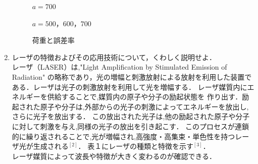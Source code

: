 \documentclass[a4paper,11pt]{jsarticle}
\begin{document}
\begin{enumerate}
\begin{figure}[h]
  \caption{$a = 700$}
\end{figure}
\clearpage
\begin{figure}[h]
  \centering
  \caption{$a = 500，600，700$}
\end{figure}
\clearpage
\begin{figure}[h]
  \centering
  \caption{荷重と誤差率}
\end{figure}
\clearpage
\item レーザの特徴およびその応用技術について，くわしく説明せよ．\\
\quad レーザ（LASER）は,"Light Amplification by Stimulated Emission of Radiation" 
の略称であり，光の増幅と刺激放射による放射を利用した装置である．レーザは光子の刺激放射を利用して光を増幅する．
レーザ媒質内にエネルギーを供給することで,媒質内の原子や分子の励起状態を
作り出す．励起された原子や分子は,外部からの光子の刺激によってエネルギーを放出し,さらに光子を放出する．
この放出された光子は,他の励起された原子や分子に対して刺激を与え,同様の光子の放出を引き起こす．
このプロセスが連鎖的に繰り返されることで,光が増幅され,高強度・高集束・単色性を持つレーザ光が生成される$^{[2]}$．
表１にレーザの種類と特徴を示す$^{[3]}$．\\レーザ媒質によって波長や特徴が大きく変わるのが確認できる．



\end{enumerate}
\end{document}
